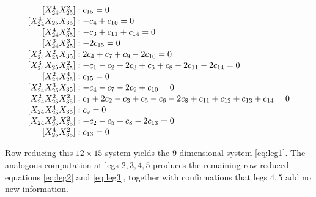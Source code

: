 \documentclass[11pt]{article}
\theoremstyle{plain}
\theoremstyle{definition}
\begin{document}
\begin{equation*}
\begin{array}{r@{\;:\;}l}
[X_{24}^4 X_{25}^2]       & c_{15} = 0 \\[1pt]
[X_{24}^4 X_{25} X_{35}]  & -c_4 + c_{10} = 0 \\[1pt]
[X_{24}^4 X_{35}^2]       & -c_3 + c_{11} + c_{14} = 0 \\[1pt]
[X_{24}^3 X_{25}^3]       & -2 c_{15} = 0 \\[1pt]
[X_{24}^3 X_{25}^2 X_{35}]& 2c_4 + c_7 + c_9 - 2c_{10} = 0 \\[1pt]
[X_{24}^3 X_{25} X_{35}^2]& -c_1 - c_2 + 2c_3 + c_6 + c_8 - 2c_{11} - 2c_{14} = 0 \\[1pt]
[X_{24}^2 X_{25}^4]       & c_{15} = 0 \\[1pt]
[X_{24}^2 X_{25}^3 X_{35}]& -c_4 - c_7 - 2c_9 + c_{10} = 0 \\[1pt]
[X_{24}^2 X_{25}^2 X_{35}^2]& c_1 + 2c_2 - c_3 + c_5 - c_6 - 2c_8 + c_{11} + c_{12} + c_{13} + c_{14} = 0 \\[1pt]
[X_{24} X_{25}^4 X_{35}]  & c_9 = 0 \\[1pt]
[X_{24} X_{25}^3 X_{35}^2]& -c_2 - c_5 + c_8 - 2c_{13} = 0 \\[1pt]
[X_{25}^4 X_{35}^2]       & c_{13} = 0
\end{array}
\end{equation*}

Row-reducing this $12 \times 15$ system yields the $9$-dimensional system
\eqref{eq:leg1}. The analogous computation at legs $2, 3, 4, 5$ produces the
remaining row-reduced equations \eqref{eq:leg2} and \eqref{eq:leg3}, together with
confirmations that legs $4, 5$ add no new information.


\end{document}
